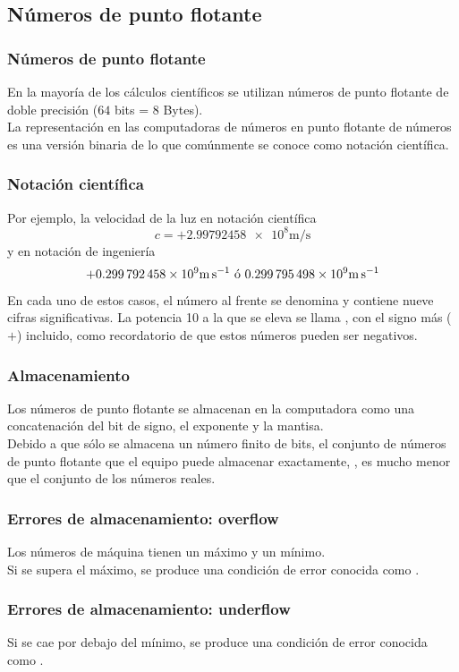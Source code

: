 \subsection{Números de punto flotante}
\begin{frame}
\frametitle{Números de punto flotante}
En la mayoría de los cálculos científicos se utilizan números de punto flotante de doble precisión ($64$ bits = 8 Bytes).
\\
\bigskip
La representación en las computadoras de números en punto flotante de números es una versión binaria de lo que comúnmente se conoce como notación científica.
\end{frame}
\begin{frame}
\frametitle{Notación científica}
Por ejemplo, la velocidad de la luz en notación científica
\[ c = + \num{2.99792458e8} \si{\meter\per\second} \]
y en notación de ingeniería
\[ + \num{	0.299792458e9} \si{\meter\per\second} \mbox{ ó } \num{0.299795498E9} \si{\meter\per\second} \]
\pause
En cada uno de estos casos, el número al frente se denomina  y contiene nueve cifras significativas. La potencia 10 a la que se eleva se llama , con el signo más ($+$) incluido, como recordatorio de que estos números pueden ser negativos.
\end{frame}
\begin{frame}
\frametitle{Almacenamiento}
Los números de punto flotante se almacenan en la computadora como una concatenación del bit de signo, el exponente y la mantisa.
\\
\bigskip
Debido a que sólo se almacena un número finito de bits, el conjunto de números de punto flotante que el equipo puede almacenar exactamente, , es mucho menor que el conjunto de los números reales.
\end{frame}
\begin{frame}
\frametitle{Errores de almacenamiento: overflow}
Los números de máquina tienen un máximo y un mínimo.
\\
\bigskip
Si se supera el máximo, se produce una condición de error conocida como .
\begin{figure}
\centering

\end{figure}
\end{frame}
\begin{frame}
\frametitle{Errores de almacenamiento: underflow}
\begin{figure}
\centering

\end{figure}
Si se cae por debajo del mínimo, se produce una condición de error conocida como .
\end{frame}
